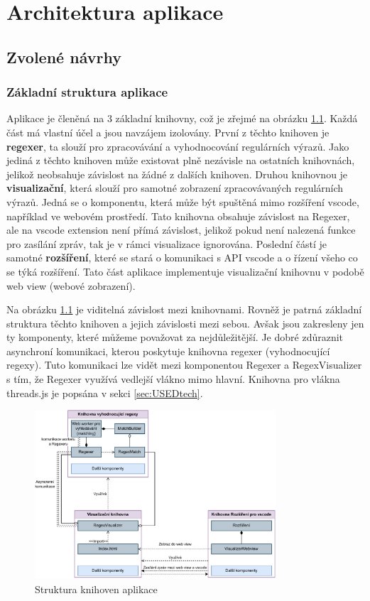 \chapter{Architektura aplikace}\label{sec:ApplicationTechnology}

\section{Zvolené návrhy}

\subsection*{Základní struktura aplikace}

Aplikace je členěná na 3 základní knihovny, což je zřejmé na obrázku \ref{fig:ARCH}.
Každá část má vlastní účel a jsou navzájem izolovány.
První z těchto knihoven je \textbf{regexer}, ta slouží pro zpracovávání a vyhodnocování regulárních výrazů.
Jako jediná z těchto knihoven může existovat plně nezávisle na ostatních knihovnách, jelikož neobsahuje závislost na žádné z dalších knihoven.
Druhou knihovnou je \textbf{visualizační}, která slouží pro samotné zobrazení zpracovávaných regulárních výrazů.
Jedná se o komponentu, která může být spuštěná mimo rozšíření vscode, například ve webovém prostředí.
Tato knihovna obsahuje závislost na Regexer, ale na vscode extension není přímá závislost, jelikož pokud není nalezená funkce pro zasílání zpráv, tak je v rámci visualizace ignorována.
Poslední částí je samotné \textbf{rozšíření}, které se stará o komunikaci s API vscode a o řízení všeho co se týká rozšíření.
Tato část aplikace implementuje visualizační knihovnu v podobě web view (webové zobrazení).

Na obrázku \ref{fig:ARCH} je viditelná závislost mezi knihovnami. 
Rovněž je patrná základní struktura těchto knihoven a jejich závislosti mezi sebou.
Avšak jsou zakresleny jen ty komponenty, které můžeme považovat za nejdůležitější. 
Je dobré zdůraznit asynchroní komunikaci, kterou poskytuje knihovna regexer (vyhodnocující regexy).
Tuto komunikaci lze vidět mezi komponentou Regexer a RegexVisualizer s tím, že Regexer využívá vedlejší vlákno mimo hlavní. 
Knihovna pro vlákna threads.js je popsána v sekci \ref{sec:USEDtech}.

\begin{figure}[!h]
	\centering
	\includegraphics[width=0.8\textwidth]{Figures/BP-Arch.pdf}
	\caption{Struktura knihoven aplikace}
	\label{fig:ARCH}
\end{figure}

